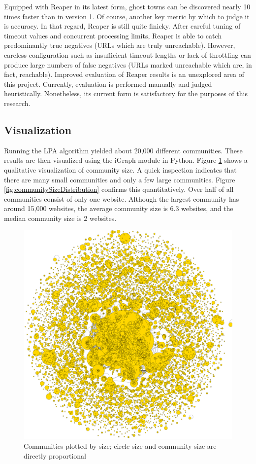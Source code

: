 \documentclass[conference]{IEEEtran}
\begin{document}
Equipped with Reaper in its latest form, ghost towns can be discovered nearly 10 times faster than in version 1. Of course, another key metric by which to judge it is accuracy. In that regard, Reaper is still quite finicky. After careful tuning of timeout values and concurrent processing limits, Reaper is able to catch predominantly true negatives (URLs which are truly unreachable). However, careless configuration such as insufficient timeout lengths or lack of throttling can produce large numbers of false negatives (URLs marked unreachable which are, in fact, reachable). Improved evaluation of Reaper results is an unexplored area of this project. Currently, evaluation is performed manually and judged heuristically. Nonetheless, its current form is satisfactory for the purposes of this research.

\subsection{Visualization}

Running the LPA algorithm yielded about 20,000 different communities. These results are then visualized using the iGraph module in Python. Figure \ref{fig:communitySizes} shows a qualitative visualization of community size. A quick inspection indicates that there are many small communities and only a few large communities. Figure \ref{fig:communitySizeDistribution} confirms this quantitatively. Over half of all communities consist of only one website. Although the largest community has around 15,000 websites, the average community size is 6.3 websites, and the median community size is 2 websites.

\begin{figure}[htbp]
 \centerline{\includegraphics[width=\columnwidth]{communities_by_size.png}}
 \caption{Communities plotted by size; circle size and community size are directly proportional}
 \label{fig:communitySizes}
\end{figure}
\end{document}
